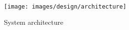 
\begin{figure}[H]
	\centering
    \texttt{[image: images/design/architecture]}
    \caption[Architecture]{System architecture}
    \label{fig:architecture}
\end{figure}
